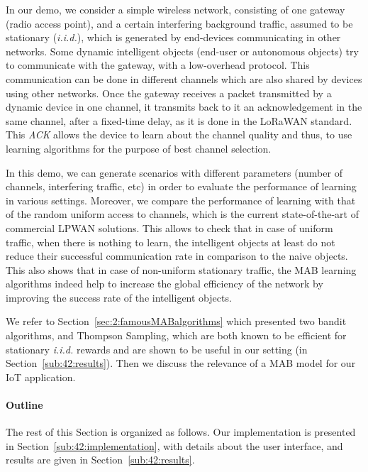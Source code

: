 In our demo, we consider a simple wireless network, consisting of one gateway (radio access point), and a certain interfering background traffic, assumed to be stationary (\emph{i.i.d.}), which is generated by end-devices communicating in other networks.
Some dynamic intelligent objects (end-user or autonomous objects) try to communicate with the gateway, with a low-overhead protocol. This communication can be done in different channels which are also shared by devices using other networks.
Once the gateway receives a packet transmitted by a dynamic device in one channel, it transmits back to it an acknowledgement in the same channel, after a fixed-time delay, as it is done in the LoRaWAN standard.
This \emph{ACK} allows the device to learn about the channel quality and thus, to use learning algorithms for the purpose of best channel selection.

In this demo, we can generate scenarios with different parameters (number of channels, interfering traffic, etc) in order to evaluate the performance of learning in various settings.
Moreover, we compare the performance of learning with that of the random uniform access to channels, which is the current state-of-the-art of commercial LPWAN solutions.
%
This allows to check that in case of uniform traffic, when there is nothing to learn, the intelligent objects at least do not reduce their successful communication rate in comparison to the naive objects.
This also shows that in case of non-uniform stationary traffic, the MAB learning algorithms indeed help to increase the global efficiency of the network by improving the success rate of the intelligent objects.

We refer to Section~\ref{sec:2:famousMABalgorithms} which presented two bandit algorithms, \UCB{} and Thompson Sampling,
which are both known to be efficient for stationary \emph{i.i.d.} rewards and are shown to be useful in our setting (in Section~\ref{sub:42:results}).
Then we discuss the relevance of a MAB model for our IoT application.


\paragraph{Outline}

The rest of this Section is organized as follows.
Our implementation is presented in Section~\ref{sub:42:implementation}, with details about the user interface, and results are given in Section~\ref{sub:42:results}.


